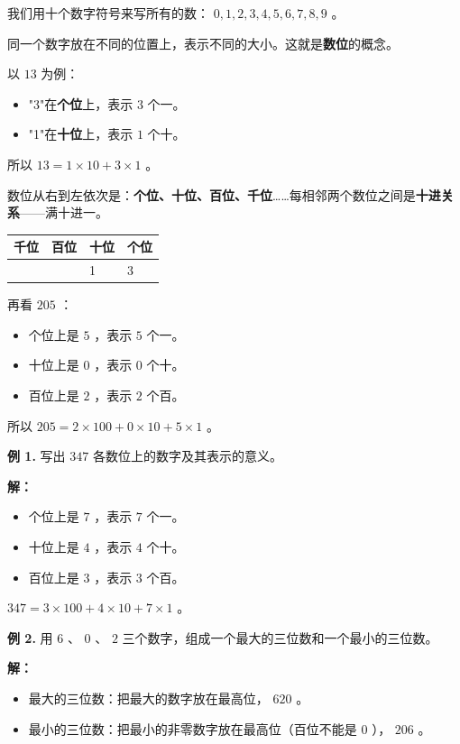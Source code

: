 \begin{understand}


我们用十个数字符号来写所有的数： $0, 1, 2, 3, 4, 5, 6, 7, 8, 9$ 。

同一个数字放在不同的位置上，表示不同的大小。这就是\textbf{数位}的概念。

以 $13$ 为例：
\begin{itemize}
  \item "3"在\textbf{个位}上，表示 $3$ 个一。
  \item "1"在\textbf{十位}上，表示 $1$ 个十。
\end{itemize}


所以 $13 = 1 \times 10 + 3 \times 1$ 。

数位从右到左依次是：\textbf{个位、十位、百位、千位}……每相邻两个数位之间是\textbf{十进关系}——满十进一。

\begin{center}
\begin{tabular}{llll}
\toprule
千位 & 百位 & 十位 & 个位 \\
\midrule
 &  & 1 & 3 \\
\bottomrule
\end{tabular}
\end{center}


再看 $205$ ：
\begin{itemize}
  \item 个位上是 $5$ ，表示 $5$ 个一。
  \item 十位上是 $0$ ，表示 $0$ 个十。
  \item 百位上是 $2$ ，表示 $2$ 个百。
\end{itemize}


所以 $205 = 2 \times 100 + 0 \times 10 + 5 \times 1$ 。

\end{understand}

\begin{workedexamples}


\textbf{例 1.} 写出 $347$ 各数位上的数字及其表示的意义。

\textbf{解：}
\begin{itemize}
  \item 个位上是 $7$ ，表示 $7$ 个一。
  \item 十位上是 $4$ ，表示 $4$ 个十。
  \item 百位上是 $3$ ，表示 $3$ 个百。
\end{itemize}


$347 = 3 \times 100 + 4 \times 10 + 7 \times 1$ 。

\textbf{例 2.} 用 $6$ 、 $0$ 、 $2$ 三个数字，组成一个最大的三位数和一个最小的三位数。

\textbf{解：}
\begin{itemize}
  \item 最大的三位数：把最大的数字放在最高位， $620$ 。
  \item 最小的三位数：把最小的非零数字放在最高位（百位不能是 $0$ ）， $206$ 。
\end{itemize}


\end{workedexamples}

